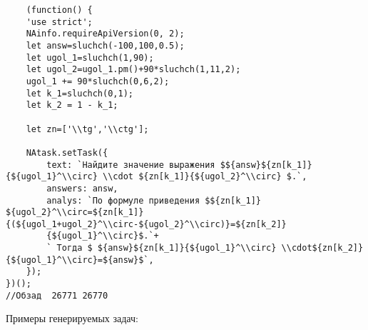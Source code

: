 \vspace{\baselineskip}

\vspace{\baselineskip}

\vspace{\baselineskip}
\vspace{\baselineskip}

\begin{lstlisting}
	(function() {
	'use strict';
	NAinfo.requireApiVersion(0, 2);
	let answ=sluchch(-100,100,0.5);
	let ugol_1=sluchch(1,90);
	let ugol_2=ugol_1.pm()+90*sluchch(1,11,2);
	ugol_1 += 90*sluchch(0,6,2);
	let k_1=sluchch(0,1);
	let k_2 = 1 - k_1;

	let zn=['\\tg','\\ctg'];
	
	NAtask.setTask({
		text: `Найдите значение выражения $${answ}${zn[k_1]}{${ugol_1}^\\circ} \\cdot ${zn[k_1]}{${ugol_2}^\\circ} $.`,
		answers: answ, 
		analys: `По формуле приведения $${zn[k_1]} ${ugol_2}^\\circ=${zn[k_1]}{(${ugol_1+ugol_2}^\\circ-${ugol_2}^\\circ)}=${zn[k_2]}
		{${ugol_1}^\\circ}$.`+
		` Тогда $ ${answ}${zn[k_1]}{${ugol_1}^\\circ} \\cdot${zn[k_2]}{${ugol_1}^\\circ}=${answ}$`,
	});
})();
//Обзад  26771 26770
\end{lstlisting}
Примеры генерируемых задач:

